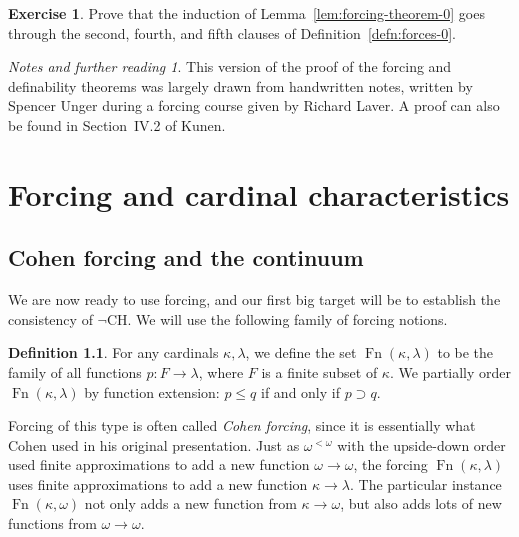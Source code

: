 \documentclass[11pt,oneside]{amsbook}
\DeclareMathOperator{\Fn}{Fn}
\theoremstyle{definition}
\newtheorem{exercise}{Exercise}[section]
\theoremstyle{plain}
\theoremstyle{definition}
\newtheorem{definition}[theorem]{Definition}
\theoremstyle{remark}
\newtheorem*{notes}{Notes and further reading}
\numberwithin{equation}{section}
\numberwithin{figure}{section}
\begin{document}
\begin{exercise}
  \label{exerc:forcing-clauses-245}
  Prove that the induction of Lemma~\ref{lem:forcing-theorem-0} goes through the second, fourth, and fifth clauses of Definition~\ref{defn:forces-0}.
\end{exercise}

\begin{notes}
  This version of the proof of the forcing and definability theorems was largely drawn from handwritten notes, written by Spencer Unger during a forcing course given by Richard Laver. A proof can also be found in Section~IV.2 of Kunen.
\end{notes}


\chapter{Forcing and cardinal characteristics}

\section{Cohen forcing and the continuum}

We are now ready to use forcing, and our first big target will be to establish the consistency of $\neg$CH. We will use the following family of forcing notions.

\begin{definition}
  For any cardinals $\kappa,\lambda$, we define the set $\Fn(\kappa,\lambda)$ to be the family of all functions $p\colon F\to\lambda$, where $F$ is a finite subset of $\kappa$. We partially order $\Fn(\kappa,\lambda)$ by function extension: $p\leq q$ if and only if $p\supset q$.
\end{definition}

Forcing of this type is often called \emph{Cohen forcing}, since it is essentially what Cohen used in his original presentation. Just as $\omega^{<\omega}$ with the upside-down order used finite approximations to add a new function $\omega\to\omega$, the forcing $\Fn(\kappa,\lambda)$ uses finite approximations to add a new function $\kappa\to\lambda$. The particular instance $\Fn(\kappa,\omega)$ not only adds a new function from $\kappa\to\omega$, but also adds lots of new functions from $\omega\to\omega$.
\end{document}
